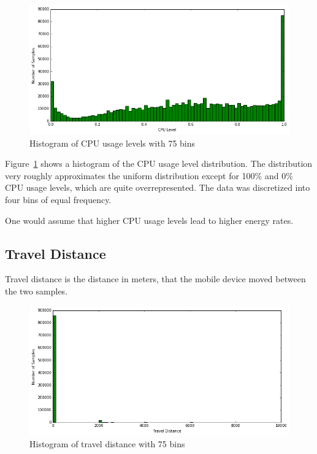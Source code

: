 \begin{figure}[!htbp]
	\centering
	\includegraphics[width=\textwidth]{images/carat-data/cpu_level.png}
	\caption{Histogram of CPU usage levels with 75 bins}
	\label{figure:carat-data-cpu-level}
\end{figure}  

Figure~\ref{figure:carat-data-cpu-level} shows a histogram of the CPU usage level distribution. The distribution very roughly approximates the uniform distribution except for 100\% and 0\% CPU usage levels, which are quite overrepresented. The data was discretized into four bins of equal frequency.

One would assume that higher CPU usage levels lead to higher energy rates. 

\subsection{Travel Distance}  

Travel distance is the distance in meters, that the mobile device moved between the two samples. 

\begin{figure}[!htbp]
	\centering
	\includegraphics[width=\textwidth]{images/carat-data/travel_distance.png}
	\caption{Histogram of travel distance with 75 bins}
	\label{figure:carat-data-travel-distance}
\end{figure}  

